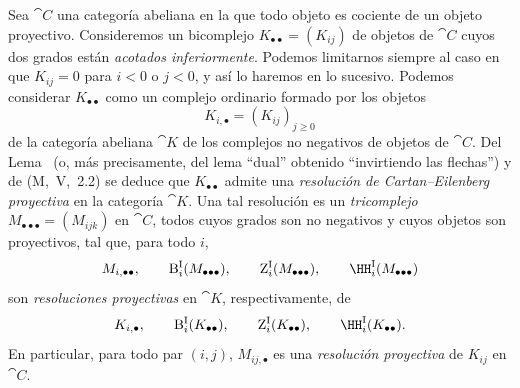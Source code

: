 \documentclass[oneside]{amsart}
\renewcommand{\geq}{\geqslant}
\let\EGAOriginalLabel\label
\renewcommand{\label}[1]{\phantomsection\EGAOriginalLabel{#1}}
\begin{document}
\begin{env}[11.7.1]
\label{0.11.7.1}
Sea $\cat{C}$ una categoría abeliana en la que todo objeto es cociente de un
objeto proyectivo.
Consideremos un bicomplejo $K_{\bullet\bullet}=(K_{ij})$ de objetos de $\cat{C}$ cuyos
dos grados están \emph{acotados inferiormente}.
Podemos limitarnos siempre al caso en que $K_{ij}=0$ para $i<0$ o
$j<0$, y así lo haremos en lo sucesivo.
Podemos considerar $K_{\bullet\bullet}$ como un complejo ordinario formado por los
objetos
\[
  K_{i,\bullet}=(K_{ij})_{j\geq 0}
\]
de la categoría abeliana $\cat{K}$ de los complejos no negativos de objetos de
$\cat{C}$.
Del Lema~ (o, más precisamente, del lema
``dual'' obtenido ``invirtiendo las flechas'') y de (M,~V,~2.2) se deduce
que $K_{\bullet\bullet}$ admite una \emph{resolución de Cartan--Eilenberg
proyectiva} en la categoría $\cat{K}$.
Una tal resolución es un \emph{tricomplejo}
$M_{\bullet\bullet\bullet}=(M_{ijk})$ en $\cat{C}$, todos cuyos grados son
no negativos y cuyos objetos son proyectivos, tal que, para todo $i$,
\[
  M_{i,\bullet\bullet},\qquad
  \mathrm{B}^{\mathrm{I}}_i(M_{\bullet\bullet\bullet}),\qquad
  \mathrm{Z}^{\mathrm{I}}_i(M_{\bullet\bullet\bullet}),\qquad
  \HH^{\mathrm{I}}_i(M_{\bullet\bullet\bullet})
\]
son \emph{resoluciones proyectivas} en $\cat{K}$, respectivamente, de
\[
  K_{i,\bullet},\qquad
  \mathrm{B}^{\mathrm{I}}_i(K_{\bullet\bullet}),\qquad
  \mathrm{Z}^{\mathrm{I}}_i(K_{\bullet\bullet}),\qquad
  \HH^{\mathrm{I}}_i(K_{\bullet\bullet}).
\]
En particular, para todo par $(i,j)$, $M_{ij,\bullet}$ es una \emph{resolución
proyectiva} de $K_{ij}$ en $\cat{C}$.
\end{env}
\end{document}

